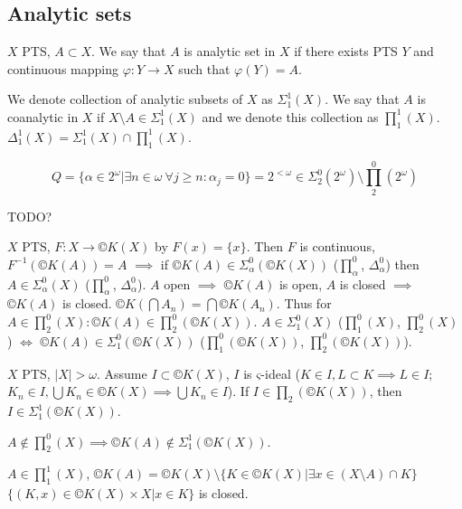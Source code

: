 \documentclass[12pt]{article}					%
\begin{document}
\subsection{Analytic sets}
\begin{definice}
	$X$ PTS, $A \subset X$. We say that $A$ is analytic set in $X$ if there exists PTS $Y$ and continuous mapping $φ: Y \rightarrow X$ such that $φ(Y) = A$.

	We denote collection of analytic subsets of $X$ as $Σ_1^1(X)$. We say that $A$ is coanalytic in $X$ if $X \setminus A \in Σ_1^1(X)$ and we denote this collection as $∏_1^1(X)$. $Δ_1^1(X) = Σ_1^1(X) \cap ∏_1^1(X)$.
\end{definice}

\begin{priklady}
	$$ Q = \{α \in 2^ω | \exists n \in ω\ \forall j ≥ n: α_j = 0\} = 2^{<ω} \in Σ_2^0(2^ω) \setminus ∏_2^0(2^ω) $$

	TODO?
\end{priklady}

\begin{poznamka}
	$X$ PTS, $F: X \rightarrow ©K(X)$ by $F(x) = \{x\}$. Then $F$ is continuous, $F^{-1}(©K(A)) = A$ $\implies$ if $©K(A) \in Σ_α^0 (©K(X))$ ($∏_α^0$, $Δ_α^0$) then $A \in Σ_α^0(X)$ ($∏_α^0$, $Δ_α^0$). $A$ open $\implies$ $©K(A)$ is open, $A$ is closed $\implies$ $©K(A)$ is closed. $©K(\bigcap A_n) = \bigcap ©K(A_n)$. Thus for $A \in ∏_2^0(X) : ©K(A) \in ∏_2^0(©K(X))$. $A \in Σ_1^0(X)$ ($∏_1^0(X)$, $∏_2^0(X)$) $\Leftrightarrow$ $©K(A) \in Σ_1^0(©K(X))$ ($∏_1^0(©K(X))$, $∏_2^0(©K(X))$).
\end{poznamka}

\begin{veta}
	$X$ PTS, $|X| > ω$. Assume $I \subset ©K(X)$, $I$ is $ς$-ideal ($K \in I, L \subset K \implies L \in I$; $K_n \in I, \bigcup K_n \in ©K(X) \implies \bigcup K_n \in I$). If $I \in ∏_2(©K(X))$, then $I \in Σ_1^1(©K(X))$.
\end{veta}

\begin{dusledek}
	$A \notin ∏_2^0(X) \implies ©K(A) \notin Σ_1^1(©K(X))$.
\end{dusledek}

\begin{poznamka}
	$A \in ∏_1^1(X)$, $©K(A) = ©K(X) \setminus \{K \in ©K(X) | \exists x \in (X \setminus A) \cap K\}$ %
	$\{(K, x) \in ©K(X) \times X | x \in K\}$ is closed.
\end{poznamka}
\end{document}
